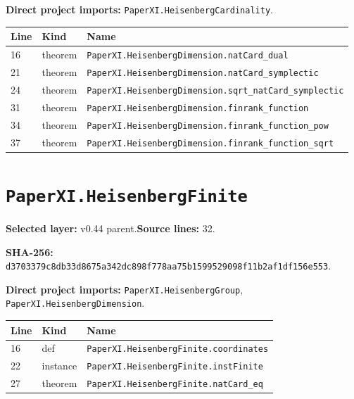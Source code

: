 \documentclass[10pt,oneside]{book}
\begin{document}
\textbf{Direct project imports:} \nolinkurl{PaperXI.HeisenbergCardinality}.

\begin{longtable}{@{}p{}p{}p{}@{}}\toprule Line&Kind&Name\\\midrule\endhead

16&theorem&\nolinkurl{PaperXI.HeisenbergDimension.natCard_dual}\\

21&theorem&\nolinkurl{PaperXI.HeisenbergDimension.natCard_symplectic}\\

24&theorem&\nolinkurl{PaperXI.HeisenbergDimension.sqrt_natCard_symplectic}\\

31&theorem&\nolinkurl{PaperXI.HeisenbergDimension.finrank_function}\\

34&theorem&\nolinkurl{PaperXI.HeisenbergDimension.finrank_function_pow}\\

37&theorem&\nolinkurl{PaperXI.HeisenbergDimension.finrank_function_sqrt}\\

\bottomrule\end{longtable}

\section{\texorpdfstring{\nolinkurl{PaperXI.HeisenbergFinite}}{PaperXI.HeisenbergFinite}}\label{module:PaperXI.HeisenbergFinite}

\textbf{Selected layer:} v0.44 parent.\quad\textbf{Source lines:} 32.\par\textbf{SHA-256:} {\scriptsize\nolinkurl{d3703379c8db33d8675a342dc898f778aa75b1599529098f11b2af1df156e553}}.


\textbf{Direct project imports:} \nolinkurl{PaperXI.HeisenbergGroup}, \nolinkurl{PaperXI.HeisenbergDimension}.

\begin{longtable}{@{}p{}p{}p{}@{}}\toprule Line&Kind&Name\\\midrule\endhead

16&def&\nolinkurl{PaperXI.HeisenbergFinite.coordinates}\\

22&instance&\nolinkurl{PaperXI.HeisenbergFinite.instFinite}\\

27&theorem&\nolinkurl{PaperXI.HeisenbergFinite.natCard_eq}\\

\bottomrule\end{longtable}
\end{document}
